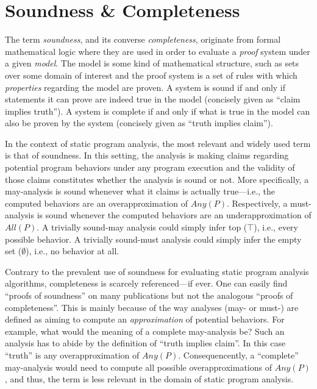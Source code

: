 \section{Soundness \& Completeness}
\label{sec:intro:soundness}

The term \emph{soundness}, and its converse \emph{completeness}, originate from formal mathematical logic where they are used in order to evaluate a \emph{proof} system under a given \emph{model}. The model is some kind of mathematical structure, such as sets over some domain of interest and the proof system is a set of rules with which \emph{properties} regarding the model are proven. A system is sound if and only if statements it can prove are indeed true in the model (concisely given as ``claim implies truth''). A system is complete if and only if what is true in the model can also be proven by the system (concisely given as ``truth implies claim'').

In the context of static program analysis, the most relevant and widely used term is that of soundness. In this setting, the analysis is making claims regarding potential program behaviors under any program execution and the validity of those claims constitutes whether the analysis is sound or not. More specifically, a may-analysis is sound whenever what it claims is actually true---i.e., the computed behaviors are an overapproximation of $Any(P)$. Respectively, a must-analysis is sound whenever the computed behaviors are an underapproximation of $All(P)$. A trivially sound-may analysis could simply infer top ($\top$), i.e., every possible behavior. A trivially sound-must analysis could simply infer the empty set ($\emptyset$), i.e., no behavior at all.

Contrary to the prevalent use of soundness for evaluating static program analysis algorithms, completeness is scarcely referenced---if ever. One can easily find ``proofs of soundness'' on many publications but not the analogous ``proofs of completeness''. This is mainly because of the way analyses (may- or must-) are defined as aiming to compute an \emph{approximation} of potential behaviors. For example, what would the meaning of a complete may-analysis be? Such an analysis has to abide by the definition of ``truth implies claim''. In this case ``truth'' is any overapproximation of $Any(P)$. Consequencently, a ``complete'' may-analysis would need to compute all possible overapproximations of $Any(P)$, and thus, the term is less relevant in the domain of static program analysis.

